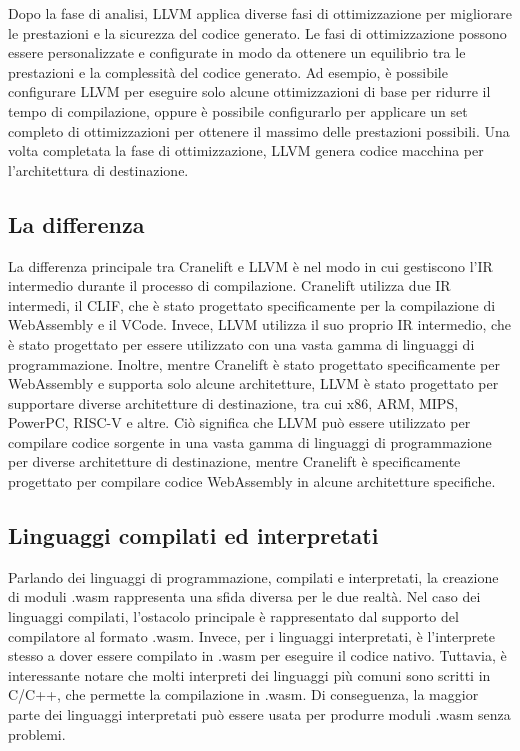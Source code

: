 Dopo la fase di analisi, LLVM applica diverse fasi di ottimizzazione per migliorare le prestazioni e la sicurezza del
codice generato. Le fasi di ottimizzazione possono essere personalizzate e configurate in modo da ottenere un equilibrio
tra le prestazioni e la complessità del codice generato. Ad esempio, è possibile configurare LLVM per eseguire solo
alcune ottimizzazioni di base per ridurre il tempo di compilazione, oppure è possibile configurarlo per applicare un set
completo di ottimizzazioni per ottenere il massimo delle prestazioni possibili. Una volta completata la fase di
ottimizzazione, LLVM genera codice macchina per l'architettura di destinazione.

\subsection{La differenza}
La differenza principale tra Cranelift e LLVM è nel modo in cui gestiscono l'IR intermedio durante il processo di
compilazione. Cranelift utilizza due IR intermedi, il CLIF, che è stato progettato specificamente per la compilazione di
WebAssembly e il VCode. Invece, LLVM utilizza il suo proprio IR intermedio, che è stato progettato per essere utilizzato
con una vasta gamma di linguaggi di programmazione. Inoltre, mentre Cranelift è stato progettato specificamente per
WebAssembly e supporta solo alcune architetture, LLVM è stato progettato per supportare diverse architetture di
destinazione, tra cui x86, ARM, MIPS, PowerPC, RISC-V e altre. Ciò significa che LLVM può essere utilizzato per
compilare codice sorgente in una vasta gamma di linguaggi di programmazione per diverse architetture di destinazione,
mentre Cranelift è specificamente progettato per compilare codice WebAssembly in alcune architetture specifiche.

\subsection{Linguaggi compilati ed interpretati}
Parlando dei linguaggi di programmazione, compilati e interpretati, la creazione di moduli .wasm rappresenta una sfida
diversa per le due realtà. Nel caso dei linguaggi compilati, l'ostacolo principale è rappresentato dal supporto del
compilatore al formato .wasm. Invece, per i linguaggi interpretati, è l'interprete stesso a dover essere compilato in
.wasm per eseguire il codice nativo. Tuttavia, è interessante notare che molti interpreti dei linguaggi più comuni sono
scritti in C/C++, che permette la compilazione in .wasm. Di conseguenza, la maggior parte dei linguaggi interpretati può
essere usata per produrre moduli .wasm senza problemi.

